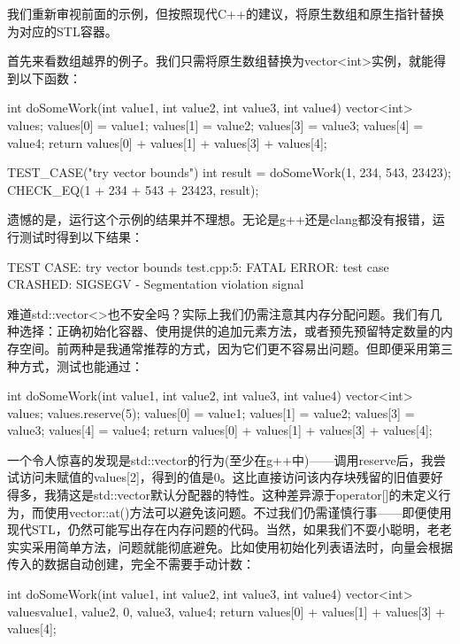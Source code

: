 
我们重新审视前面的示例，但按照现代C++的建议，将原生数组和原生指针替换为对应的STL容器。

首先来看数组越界的例子。我们只需将原生数组替换为vector<int>实例，就能得到以下函数：

\begin{cpp}
int doSomeWork(int value1, int value2, int value3, int value4) {
  vector<int> values;
  values[0] = value1;
  values[1] = value2;
  values[3] = value3;
  values[4] = value4;
  return values[0] + values[1] + values[3] + values[4];
}

TEST_CASE("try vector bounds"){
  int result = doSomeWork(1, 234, 543, 23423);
  CHECK_EQ(1 + 234 + 543 + 23423, result);
}
\end{cpp}

遗憾的是，运行这个示例的结果并不理想。无论是g++还是clang都没有报错，运行测试时得到以下结果：

\begin{shell}
TEST CASE: try vector bounds
test.cpp:5: FATAL ERROR: test case CRASHED: SIGSEGV - Segmentation violation signal
\end{shell}

难道std::vector<>也不安全吗？实际上我们仍需注意其内存分配问题。我们有几种选择：正确初始化容器、使用提供的追加元素方法，或者预先预留特定数量的内存空间。前两种是我通常推荐的方式，因为它们更不容易出问题。但即便采用第三种方式，测试也能通过：

\begin{cpp}
int doSomeWork(int value1, int value2, int value3, int value4) {
  vector<int> values;
  values.reserve(5);
  values[0] = value1;
  values[1] = value2;
  values[3] = value3;
  values[4] = value4;
  return values[0] + values[1] + values[3] + values[4];
}
\end{cpp}

一个令人惊喜的发现是std::vector的行为(至少在g++中)——调用reserve后，我尝试访问未赋值的values[2]，得到的值是0。这比直接访问该内存块残留的旧值要好得多，我猜这是std::vector默认分配器的特性。这种差异源于operator[]的未定义行为，而使用vector::at()方法可以避免该问题。不过我们仍需谨慎行事——即便使用现代STL，仍然可能写出存在内存问题的代码。当然，如果我们不耍小聪明，老老实实采用简单方法，问题就能彻底避免。比如使用初始化列表语法时，向量会根据传入的数据自动创建，完全不需要手动计数：

\begin{cpp}
int doSomeWork(int value1, int value2, int value3, int value4) {
  vector<int> values{value1, value2, 0, value3, value4};
  return values[0] + values[1] + values[3] + values[4];
}
\end{cpp}

